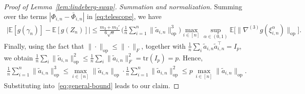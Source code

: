 \documentclass[10pt,a4paper]{amsart}
\newcommand{\Ee}{{\mathbb{E}}}
\newcommand{\op}{\mathrm{op}}
\begin{document}
\begin{proof}[Proof of Lemma~\ref{lem:lindeberg-swap}]
\medskip\noindent\textit{Summation and normalization.}
Summing over the terms $|\Phi_{i,n}-\bar\Phi_{i,n}|$ in \eqref{eq:telescope}, we have
\begin{align}
  \label{eq:general-bound}
  \big|\Ee[g(\gamma_n)]-\Ee[g(Z_n)]\big|
  \le\frac{m_3+m_3'}{6\sqrt n}\,
     \Big(\frac1n\sum_{i=1}^n\|\widetilde a_{i,n}\|_{\op}^3\Big)
     \max_{i\in[n]}\sup_{\alpha\in(0,1)}
     \Ee\big[\|\nabla^{(3)}g(\xi^\alpha_{i,n})\|_{\op}\big].
\end{align}
Finally, using the fact that $\|\cdot\|_{\op}\le\|\cdot\|_F$, together with
$\frac1n\sum_i\widetilde a_{i,n}\widetilde a_{i,n}^\top=I_p$, we obtain
$\frac1n\sum_i\|\widetilde a_{i,n}\|_{\op}^2
\le\frac1n\sum_i\|\widetilde a_{i,n}\|_F^2=\mathrm{tr}(I_p)=p$.
Hence,
\begin{align*}
  \frac1n\sum_{i=1}^n\|\widetilde a_{i,n}\|_{\op}^3
  \le\max_{i\in[n]}\|\widetilde a_{i,n}\|_{\op}\cdot
     \frac1n\sum_{i=1}^n\|\widetilde a_{i,n}\|_{\op}^2
  \le p\,\max_{i\in[n]}\|\widetilde a_{i,n}\|_{\op}.
\end{align*}
Substituting into~\eqref{eq:general-bound} leads to our claim.
\end{proof}
\end{document}
